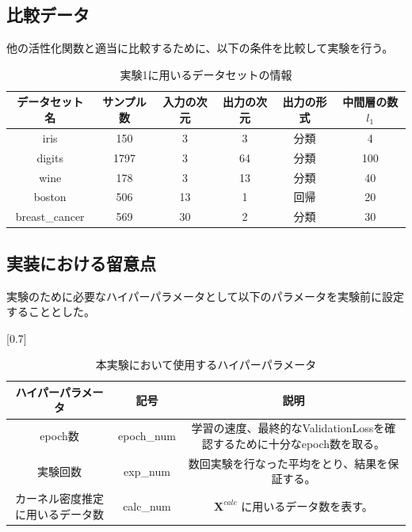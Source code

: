 \subsection{比較データ}

他の活性化関数と適当に比較するために、以下の条件を比較して実験を行う。


\begin{table}[htbp]
    \begin{center}
        \caption{実験1に用いるデータセットの情報}
        \label{dataset_name}
        \vspace{2mm} 
        \begin{tabular}{ |c|c|c|c|c|c| }
        データセット名 & サンプル数 & 入力の次元 & 出力の次元 & 出力の形式 & 中間層の数 $ {l_1} $ \\
        \hline
        iris           & 150    & 3         & 3        & 分類      & 4 \\
        digits         & 1797   & 3         & 64       & 分類      & 100 \\
        wine           & 178    & 3         & 13       & 分類      & 40 \\
        boston         & 506    & 13        & 1        & 回帰      & 20 \\
        breast\_cancer & 569    & 30        & 2        & 分類      & 30 \\
        \end{tabular}
    \end{center}
\end{table}


\subsection{実装における留意点}
実験のために必要なハイパーパラメータとして以下のパラメータを実験前に設定することとした。

\begin{table}[htbp]
    \begin{center}
        \caption{本実験において使用するハイパーパラメータ}
        \vspace{2mm} 
        \scalebox{0.7}[0.7]{
            \begin{tabular}{||c | c |c||}
            ハイパーパラメータ & 記号 & 説明 \\
            \hline
            epoch数                           & epoch\_num      & 学習の速度、最終的なValidationLossを確認するために十分なepoch数を取る。  \\
            実験回数                           & exp\_num     & 数回実験を行なった平均をとり、結果を保証する。 \\
            カーネル密度推定に用いるデータ数        & calc\_num           & $ \mathbf{X}^{calc} $ に用いるデータ数を表す。  \\
            \end{tabular}
        }
    \end{center}
\end{table}

